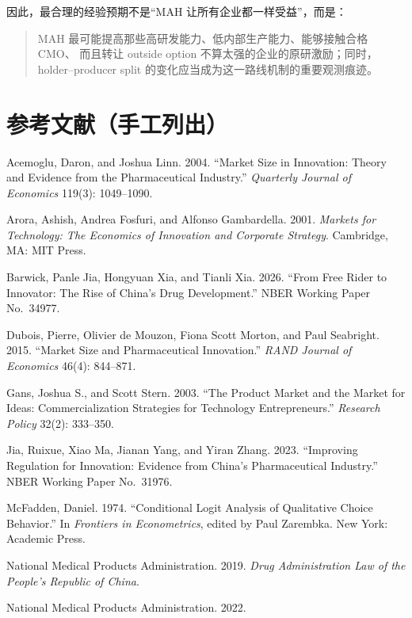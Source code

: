 \documentclass[12pt,UTF8]{ctexart}
\theoremstyle{plain}
\theoremstyle{remark}
\begin{document}
因此，最合理的经验预期不是“MAH 让所有企业都一样受益”，而是：

\begin{quote}
MAH 最可能提高那些高研发能力、低内部生产能力、能够接触合格 CMO、
而且转让 outside option 不算太强的企业的原研激励；同时，
holder--producer split 的变化应当成为这一路线机制的重要观测痕迹。
\end{quote}

\section*{参考文献（手工列出）}

\begin{enumerate}[leftmargin=2em,label={[\arabic*]}]
    \item Acemoglu, Daron, and Joshua Linn. 2004.
    ``Market Size in Innovation: Theory and Evidence from the Pharmaceutical Industry.''
    \textit{Quarterly Journal of Economics} 119(3): 1049--1090.
    \item Arora, Ashish, Andrea Fosfuri, and Alfonso Gambardella. 2001.
    \textit{Markets for Technology: The Economics of Innovation and Corporate Strategy}.
    Cambridge, MA: MIT Press.
    \item Barwick, Panle Jia, Hongyuan Xia, and Tianli Xia. 2026.
    ``From Free Rider to Innovator: The Rise of China's Drug Development.''
    NBER Working Paper No.\ 34977.
    \item Dubois, Pierre, Olivier de Mouzon, Fiona Scott Morton, and Paul Seabright. 2015.
    ``Market Size and Pharmaceutical Innovation.''
    \textit{RAND Journal of Economics} 46(4): 844--871.
    \item Gans, Joshua S., and Scott Stern. 2003.
    ``The Product Market and the Market for Ideas:
    Commercialization Strategies for Technology Entrepreneurs.''
    \textit{Research Policy} 32(2): 333--350.
    \item Jia, Ruixue, Xiao Ma, Jianan Yang, and Yiran Zhang. 2023.
    ``Improving Regulation for Innovation: Evidence from China's Pharmaceutical Industry.''
    NBER Working Paper No.\ 31976.
    \item McFadden, Daniel. 1974.
    ``Conditional Logit Analysis of Qualitative Choice Behavior.''
    In \textit{Frontiers in Econometrics}, edited by Paul Zarembka.
    New York: Academic Press.
    \item National Medical Products Administration. 2019.
    \textit{Drug Administration Law of the People's Republic of China}.
    \item National Medical Products Administration. 2022.

\end{enumerate}
\end{document}
